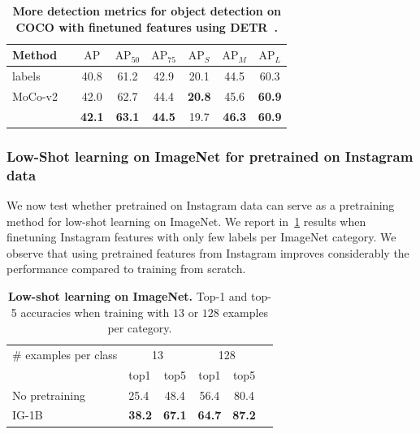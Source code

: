 \begin{table}[h]
\centering
  \caption{
\textbf{More detection metrics for object detection on COCO with finetuned features using DETR~\cite{carion2020end}.}
}
\vspace{.3em}
\begin{tabular}{ll c c c c c c}
    \toprule
	  Method && $\text{AP}$ & $\text{AP}_{50}$ & $\text{AP}_{75}$ & $\text{AP}_S$ & $\text{AP}_M$ & $\text{AP}_L$ \\
    \midrule
	\ImNet labels && 40.8 & 61.2 & 42.9 & 20.1 & 44.5 & 60.3 \\
    \midrule
	MoCo-v2 && 42.0 & 62.7 & 44.4 & \bf 20.8 & 45.6 & \bf 60.9 \\
	\OURS && \bf 42.1 & \bf 63.1 & \bf 44.5 & 19.7 & \bf 46.3 & \bf 60.9 \\
    \bottomrule
  \end{tabular}
  \label{tab:detr}
\end{table}

\subsubsection{Low-Shot learning on ImageNet for \OURS pretrained on Instagram data}
We now test whether \OURS pretrained on Instagram data can serve as a pretraining method for low-shot learning on ImageNet.
We report in~\cref{tab:detr} results when finetuning Instagram \OURS features with only few labels per ImageNet category.
We observe that using pretrained features from Instagram improves considerably the performance compared to training from scratch.
\begin{table}[h]
  \caption{
\textbf{Low-shot learning on ImageNet.} Top-1 and top-5 accuracies when training with $13$ or $128$ examples per category.
}
\vspace{.3em}
  \label{tab:semisup}
\centering
\begin{tabular}{ll c c c c}
    \toprule
	  \# examples per class & \multicolumn{2}{c}{13} & \multicolumn{2}{c}{128} \\
	  & top1 & top5 & top1 & top5 \\
    \midrule
	No pretraining & 25.4 & 48.4 & 56.4 & 80.4 \\
    \midrule
	\OURS IG-1B & \bf 38.2  & \bf 67.1  & \bf 64.7 & \bf 87.2 \\
    \bottomrule
  \end{tabular}
\end{table}

